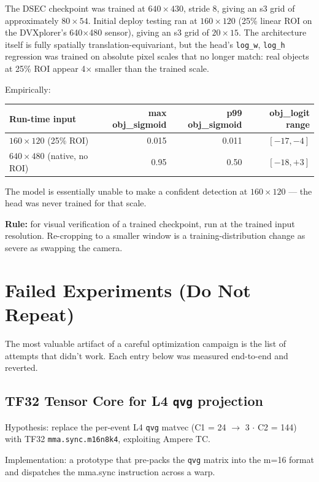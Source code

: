 \documentclass[11pt,a4paper]{article}
\begin{document}
The DSEC checkpoint was trained at $640 \times 430$, stride 8, giving
an s3 grid of approximately $80 \times 54$. Initial deploy testing ran
at $160 \times 120$ (25\% linear ROI on the DVXplorer's 640$\times$480
sensor), giving an s3 grid of $20 \times 15$. The architecture itself
is fully spatially translation-equivariant, but the head's
\texttt{log\_w}, \texttt{log\_h} regression was trained on absolute
pixel scales that no longer match: real objects at 25\% ROI appear
4$\times$ smaller than the trained scale.

Empirically:

\begin{tabularx}{\linewidth}{lrrr}
\toprule
\textbf{Run-time input} & \textbf{max obj\_sigmoid} & \textbf{p99 obj\_sigmoid} & \textbf{obj\_logit range} \\
\midrule
$160 \times 120$ (25\% ROI)             & 0.015 & 0.011 & $[-17, -4]$ \\
$640 \times 480$ (native, no ROI)       & 0.95  & 0.50  & $[-18, +3]$ \\
\bottomrule
\end{tabularx}

The model is essentially unable to make a confident detection at
$160 \times 120$ --- the head was never trained for that scale.

\textbf{Rule:} for visual verification of a trained checkpoint, run at
the trained input resolution. Re-cropping to a smaller window is a
training-distribution change as severe as swapping the camera.

\section{Failed Experiments (Do Not Repeat)}

The most valuable artifact of a careful optimization campaign is the
list of attempts that didn't work. Each entry below was measured
end-to-end and reverted.

\subsection{TF32 Tensor Core for L4 \texttt{qvg} projection}

Hypothesis: replace the per-event L4 \texttt{qvg} matvec
(C1 = 24 $\to$ 3 $\cdot$ C2 = 144) with TF32
\texttt{mma.sync.m16n8k4}, exploiting Ampere TC.

Implementation: a prototype that pre-packs the \texttt{qvg} matrix into
the m=16 format and dispatches the mma.sync instruction across a warp.
\end{document}
